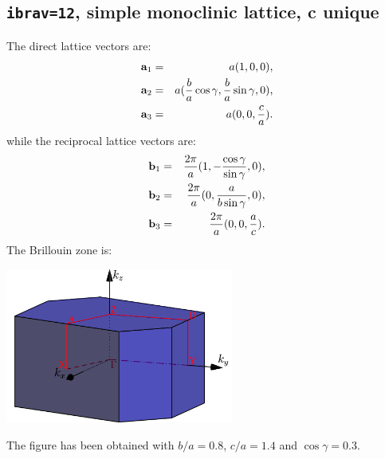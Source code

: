 \documentclass[12pt,a4paper]{article}
\begin{document}
\subsection{\texttt{ibrav=12}, simple monoclinic lattice, c unique}
The direct lattice vectors are:
\begin{eqnarray}
{\bf a}_1 &=& a (1, 0, 0), \nonumber \\
{\bf a}_2 &=& a ({b \over a} \cos{\gamma}, {b \over a}\sin{\gamma}, 0), \nonumber \\
{\bf a}_3 &=& a (0, 0, {c \over a}). 
\nonumber
\end{eqnarray}
while the reciprocal lattice vectors are:
\begin{eqnarray}
{\bf b}_1 &=& {2\pi \over a} (1, -{\cos{\gamma}\over \sin{\gamma}}, 0), \nonumber \\
{\bf b}_2 &=& {2\pi \over a} (0, {a \over b \sin{\gamma}}, 0), \nonumber \\
{\bf b}_3 &=& {2\pi \over a} (0, 0, {a \over c}). \nonumber
\end{eqnarray}
The Brillouin zone is: 
\begin{center}
\includegraphics[width=7.5cm,angle=0]{images/monoc.png} 
\end{center}
The figure has been obtained with $b/a=0.8$, $c/a=1.4$ and $\cos{\gamma}=0.3$.
\end{document}
